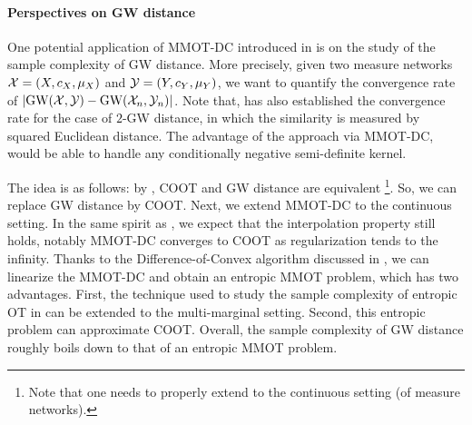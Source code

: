 
\paragraph{Perspectives on GW distance} One potential application of MMOT-DC introduced
in  is on the study of the sample complexity of GW distance.
More precisely, given two measure networks $\mathcal X = (X, c_X, \mu_X)$ and $\mathcal Y = (Y, c_Y, \mu_Y)$,
we want to quantify the convergence rate of $|\text{GW}(\mathcal X, \mathcal Y) - \text{GW}(\mathcal X_n, \mathcal Y_n)|$.
Note that, \citep{Zhang23} has also established the convergence rate for the case of $2$-GW distance,
in which the similarity is measured by squared Euclidean distance.
The advantage of the approach via MMOT-DC, would be able to handle any
conditionally negative semi-definite kernel.

The idea is as follows: by ,
COOT and GW distance are equivalent
\footnote{Note that one needs to properly extend  to the continuous setting
(of measure networks).}. So, we can replace GW distance by COOT.
Next, we extend MMOT-DC to the continuous setting. In the same spirit as ,
we expect that the interpolation property still holds,
notably MMOT-DC converges to COOT as regularization tends to the infinity.
Thanks to the Difference-of-Convex algorithm discussed in ,
we can linearize the MMOT-DC and obtain an entropic MMOT problem, which has two advantages.
First, the technique used to study the sample complexity of entropic OT in \citep{Genevay19}
can be extended to the multi-marginal setting. Second, this entropic problem can approximate COOT.
Overall, the sample complexity of GW distance roughly boils down to that of an entropic MMOT problem.

